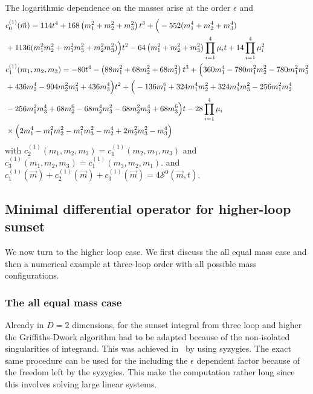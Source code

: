 \documentclass[a4paper,12pt]{article}
\numberwithin{equation}{section}
\numberwithin{figure}{subsection}
\theoremstyle{plain}
\theoremstyle{plain}
\theoremstyle{definition}
\theoremstyle{plain}
\theoremstyle{remark}
\theoremstyle{plain}
\begin{document}
The logarithmic dependence on the masses arise at the order $\epsilon$ 
 and
 \begin{align}
&     c^{(1)}_0(\vec m)=114 t^{4}+168\left(m_{1}^{2}+ m_{2}^{2}+ m_{3}^{2}\right)
  t^{3}+\Big(-552 (m_{1}^{4}+m_2^4+m_3^4)\cr&+1136 (m_{1}^{2} m_{2}^{2}+
    m_{1}^{2} m_{3}^{2}+ m_{2}^{2} m_{3}^{2})\Big) t^{2}-64
  \left(m_{1}^{2}+m_{2}^{2}+m_{3}^{2}\right) \prod_{i=1}^4\mu_i t +14 \prod_{i=1}^4\mu_i^2\\
& c^{(1)}_1(m_1,m_2,m_3)=-80 t^{4}-\left( 88 m_{1}^{2}+ 68 m_{2}^{2}+68 m_{3}^{2}\right)
 t^{3}+\Big(360 m_{1}^{4}-780 m_{1}^{2} m_{2}^{2}-780 m_{1}^{2}
   m_{3}^{2}\cr&+436 m_{2}^{4}-904 m_{2}^{2} m_{3}^{2}+436
   m_{3}^{4}\Big) t^{2}+\Big(-136 m_{1}^{6}+324 m_{1}^{4}
   m_{2}^{2}+324 m_{1}^{4} m_{3}^{2}-256 m_{1}^{2} m_{2}^{4}\cr&-256
   m_{1}^{2} m_{3}^{4}+68 m_{2}^{6}-68 m_{2}^{4} m_{3}^{2}-68
   m_{2}^{2} m_{3}^{4}+68 m_{3}^{6}\Big) t -28   \prod_{i=1}^4\mu_i\cr&\times\Big(2 m_{1}^{4}-m_{1}^{2} m_{2}^{2}-m_{1}^{2} m_{3}^{2}-m_{2}^{4}+2 m_{2}^{2} m_{3}^{2}-m_{3}^{4}\Big) 
\end{align}
with $c^{(1)}_2(m_1,m_2,m_3)=c^{(1)}_1(m_2,m_1,m_3)$ and $c^{(1)}_3(m_1,m_2,m_3)=c^{(1)}_1(m_3,m_2,m_1)$.
and $c^{(1)}_1(\vec m)+c_2^{(1)}(\vec m)+c_3^{(1)}(\vec m)=4
\mathscr{S}^0(\vec m,t)$.


\subsection{Minimal differential operator for higher-loop sunset}

We now turn to the higher loop case. We first discuss the all equal
mass case and then a numerical example at three-loop order with all
possible mass configurations.
   \subsubsection{The all equal mass case}
Already in $D=2$ dimensions, for the sunset integral from three loop
and higher  the Griffiths-Dwork algorithm had to be adapted because of
the non-isolated singularities of integrand. This was achieved
in~\cite{Lairez:2022zkj} by using syzygies. The exact same procedure can be used
for the including the $\epsilon$ dependent factor because of the
freedom left by the syzygies.   This make the computation rather long
since this involves solving large linear systems.
\end{document}
